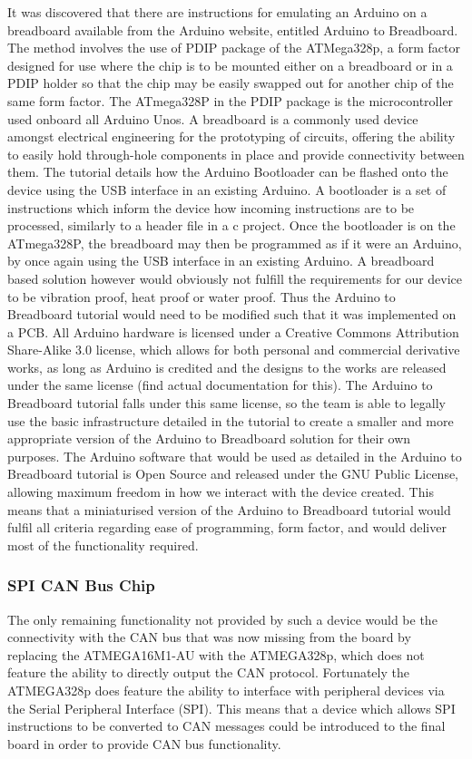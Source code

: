 It was discovered that there are instructions for emulating an Arduino on a breadboard available from the Arduino website, entitled Arduino to Breadboard\cite{ARDUINO_breadboard}. The method involves the use of PDIP package of the ATMega328p, a form factor designed for use where the chip is to be mounted either on a breadboard or in a PDIP holder so that the chip may be easily swapped out for another chip of the same form factor. The ATmega328P in the PDIP package is the microcontroller used onboard all Arduino Unos. A breadboard is a commonly used device amongst electrical engineering for the prototyping of circuits, offering the ability to easily hold through-hole components in place and provide connectivity between them. The tutorial details how the Arduino Bootloader can be flashed onto the device using the USB interface in an existing Arduino. A bootloader is a set of instructions which inform the device how incoming instructions are to be processed, similarly to a header file in a c project. Once the bootloader is on the ATmega328P, the breadboard may then be programmed as if it were an Arduino, by once again using the USB interface in an existing Arduino. A breadboard based solution however would obviously not fulfill the requirements for our device to be vibration proof, heat proof or water proof. Thus the Arduino to Breadboard tutorial would need to be modified such that it was implemented on a PCB. All Arduino hardware is licensed under a Creative Commons Attribution Share-Alike 3.0 license, which allows for both personal and commercial derivative works, as long as Arduino is credited and the designs to the works are released under the same license (find actual documentation for this). The Arduino to Breadboard tutorial falls under this same license, so the team is able to legally use the basic infrastructure detailed in the tutorial to create a smaller and more appropriate version of the Arduino to Breadboard solution for their own purposes. The Arduino software that would be used as detailed in the Arduino to Breadboard tutorial is Open Source and released under the GNU Public License, allowing maximum freedom in how we interact with the device created. This means that a miniaturised version of the Arduino to Breadboard tutorial would fulfil all criteria regarding ease of programming, form factor, and would deliver most of the functionality required.

\subsubsection{SPI CAN Bus Chip}
The only remaining functionality not provided by such a device would be the connectivity with the CAN bus that was now missing from the board by replacing the ATMEGA16M1-AU with the ATMEGA328p, which does not feature the ability to directly output the CAN protocol\cite{ATMEGA328P_datasheet}. Fortunately the ATMEGA328p does feature the ability to interface with peripheral devices via the Serial Peripheral Interface (SPI). This means that a device which allows SPI instructions to be converted to CAN messages could be introduced to the final board in order to provide CAN bus functionality\cite{MCP2515_datasheet}.

